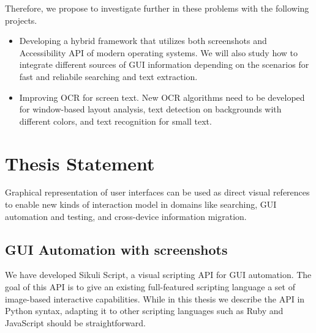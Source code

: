\documentclass{chi2009}
\begin{document}
Therefore, we propose to investigate further in these problems with the 
following projects.
\begin{itemize}
\item Developing a hybrid framework that utilizes both screenshots and 
Accessibility API of modern operating systems. We will also study how
to integrate different sources of GUI information depending on
the scenarios for fast and reliabile searching and text extraction.

\item Improving OCR for screen text. New OCR algorithms need to be developed 
for window-based layout analysis, text detection on backgrounds with different
colors, and text recognition for small text.
\end{itemize}

\section{Thesis Statement}
Graphical representation of user interfaces can be used as direct
visual references to enable new kinds of interaction model in domains
like searching, GUI automation and testing, and cross-device information 
migration.



\subsection{GUI Automation with screenshots}
We have developed Sikuli Script, a visual scripting API for GUI automation. 
The goal of this API is to give an existing
full-featured scripting language a set of image-based interactive capabilities.
While in this thesis we describe the API in Python syntax, adapting it to other
scripting languages such as Ruby and JavaScript should be straightforward.  
\end{document}
